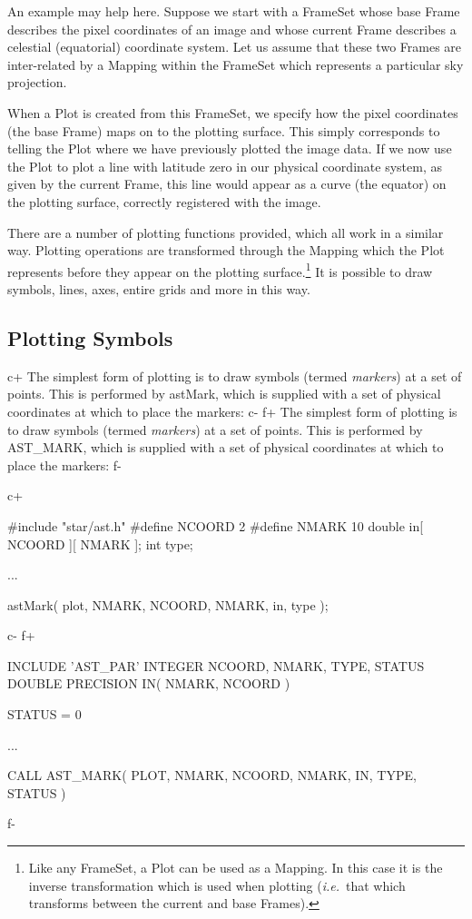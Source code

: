 \documentclass[twoside,11pt]{starlink}
\begin{document}
An example may help here. Suppose we start with a FrameSet whose base
Frame describes the pixel coordinates of an image and whose current
Frame describes a celestial (equatorial) coordinate system. Let us
assume that these two Frames are inter-related by a Mapping within the
FrameSet which represents a particular sky projection.

When a Plot is created from this FrameSet, we specify how the pixel
coordinates (the base Frame) maps on to the plotting surface. This
simply corresponds to telling the Plot where we have previously
plotted the image data. If we now use the Plot to plot a line with
latitude zero in our physical coordinate system, as given by the
current Frame, this line would appear as a curve (the equator) on the
plotting surface, correctly registered with the image.

There are a number of plotting functions provided, which all work in a
similar way. Plotting operations are transformed through the Mapping
which the Plot represents before they appear on the plotting
surface.\footnote{Like any FrameSet, a Plot can be used as a
Mapping. In this case it is the inverse transformation which is used
when plotting (\emph{i.e.}\ that which transforms between the current
and base Frames).}  It is possible to draw symbols, lines, axes,
entire grids and more in this way.


\subsection{Plotting Symbols}

c+
The simplest form of plotting is to draw symbols (termed
\emph{markers}) at a set of points. This is performed by astMark,
which is supplied with a set of physical coordinates at which to place
the markers:
c-
f+
The simplest form of plotting is to draw symbols (termed
\emph{markers}) at a set of points. This is performed by AST\_MARK,
which is supplied with a set of physical coordinates at which to place
the markers:
f-

c+
\small
\begin{terminalv}
#include "star/ast.h"
#define NCOORD 2
#define NMARK 10
double in[ NCOORD ][ NMARK ];
int type;

...

astMark( plot, NMARK, NCOORD, NMARK, in, type );
\end{terminalv}
\normalsize
c-
f+
\small
\begin{terminalv}
      INCLUDE 'AST_PAR'
      INTEGER NCOORD, NMARK, TYPE, STATUS
      DOUBLE PRECISION IN( NMARK, NCOORD )

      STATUS = 0

      ...

      CALL AST_MARK( PLOT, NMARK, NCOORD, NMARK, IN, TYPE, STATUS )
\end{terminalv}
\normalsize
f-
\end{document}
